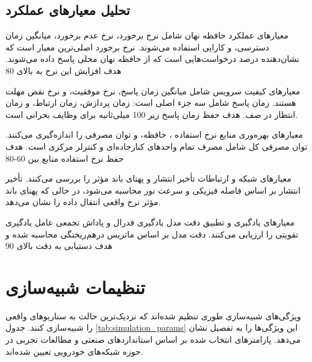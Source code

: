 \documentclass[11pt]{article}
\begin{document}
\subsection{تحلیل معیارهای عملکرد}

معیارهای عملکرد حافظه نهان شامل نرخ برخورد، نرخ عدم برخورد، میانگین زمان دسترسی، و کارایی استفاده می‌شوند. نرخ برخورد اصلی‌ترین معیار است که نشان‌دهنده درصد درخواست‌هایی است که از حافظه نهان محلی پاسخ داده می‌شوند. هدف افزایش این نرخ به بالای 80%

معیارهای کیفیت سرویس شامل میانگین زمان پاسخ، نرخ موفقیت، و نرخ نقض مهلت هستند. زمان پاسخ شامل سه جزء اصلی است: زمان پردازش، زمان ارتباط، و زمان انتظار در صف. هدف حفظ زمان پاسخ زیر 100 میلی‌ثانیه برای وظایف بحرانی است.

معیارهای بهره‌وری منابع نرخ استفاده ، حافظه، و توان مصرفی را اندازه‌گیری می‌کنند. توان مصرفی کل شامل مصرف تمام واحدهای کنارجاده‌ای و کنترلر مرکزی است. هدف حفظ نرخ استفاده منابع بین 60-80%

معیارهای شبکه و ارتباطات تأخیر انتشار و پهنای باند مؤثر را بررسی می‌کنند. تأخیر انتشار بر اساس فاصله فیزیکی و سرعت نور محاسبه می‌شود، در حالی که پهنای باند مؤثر نرخ واقعی انتقال داده را نشان می‌دهد.

معیارهای یادگیری و تطبیق دقت مدل یادگیری فدرال و پاداش تجمعی عامل یادگیری تقویتی را ارزیابی می‌کنند. دقت مدل  بر اساس ماتریس درهم‌ریختگی محاسبه شده و هدف دستیابی به دقت بالای 90%

\section{تنظیمات شبیه‌سازی}

ویژگی‌های شبیه‌سازی طوری تنظیم شده‌اند که نزدیک‌ترین حالت به سناریوهای واقعی را شبیه‌سازی کنند. جدول \ref{tab:simulation_params} این ویژگی‌ها را به تفصیل نشان می‌دهد. پارامترهای انتخاب شده بر اساس استانداردهای صنعتی و مطالعات تجربی در حوزه شبکه‌های خودرویی تعیین شده‌اند.
\end{document}
